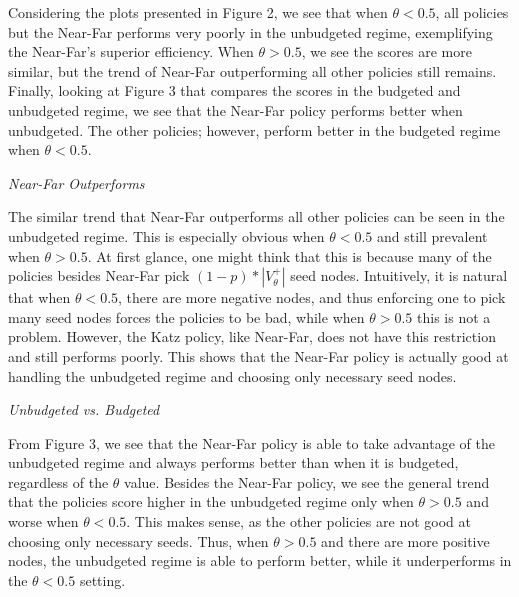 Considering the plots presented in Figure 2, we see that when $\theta < 0.5$, all policies but the Near-Far performs very poorly in the unbudgeted regime, exemplifying the Near-Far's superior efficiency. When $\theta > 0.5$, we see the scores are more similar, but the trend of Near-Far outperforming all other policies still remains. Finally, looking at Figure 3 that compares the scores in the budgeted and unbudgeted regime,  we see that the Near-Far policy performs better when unbudgeted. The other policies; however, perform better in the budgeted regime when $\theta < 0.5$.

\textit{ Near-Far Outperforms}

The similar trend that Near-Far outperforms all other policies can be seen in the unbudgeted regime. This is especially obvious when $\theta < 0.5$ and still prevalent when $\theta > 0.5$. At first glance, one might think that this is because many of the policies besides Near-Far pick $(1-p)*|V^+_\theta|$ seed nodes. Intuitively, it is natural that when $\theta < 0.5$, there are more negative nodes, and thus enforcing one to pick many seed nodes forces the policies to be bad, while when $\theta > 0.5$ this is not a problem. However, the Katz policy, like Near-Far, does not have this restriction and still performs poorly. This shows that the Near-Far policy is actually good at handling the unbudgeted regime and choosing only necessary seed nodes.

\textit{Unbudgeted vs. Budgeted}

From Figure 3, we see that the Near-Far policy is able to take advantage of the unbudgeted regime and always performs better than when it is budgeted, regardless of the $\theta$ value. Besides the Near-Far policy, we see the general trend that the policies score higher in the unbudgeted regime only when $\theta > 0.5$ and worse when $\theta < 0.5$. This makes sense, as the other policies are not good at choosing only necessary seeds. Thus, when $\theta > 0.5$ and there are more positive nodes, the unbudgeted regime is able to perform better, while it underperforms in the $\theta < 0.5$ setting.


